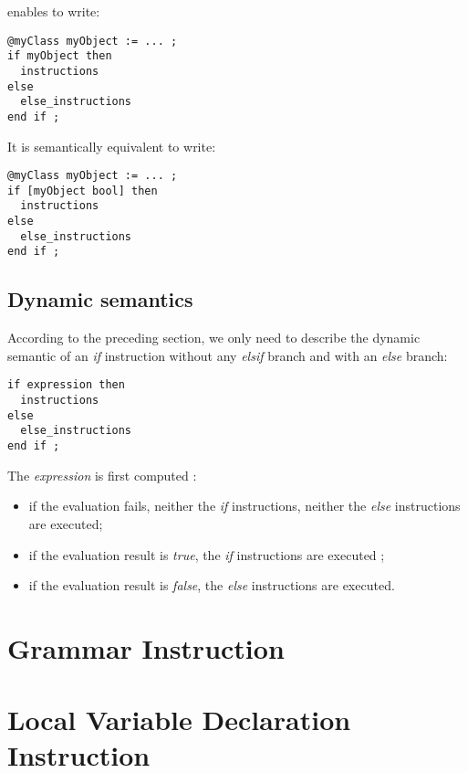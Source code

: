 enables to write:
{
\begin{lstlisting}[language=galgas]
@myClass myObject := ... ;
if myObject then
  instructions
else
  else_instructions
end if ;
\end{lstlisting}
}

It is semantically equivalent to write:
{
\begin{lstlisting}[language=galgas]
@myClass myObject := ... ;
if [myObject bool] then
  instructions
else
  else_instructions
end if ;
\end{lstlisting}
}


\subsection{Dynamic semantics}

According to the preceding section, we only need to describe the dynamic semantic of an \emph{if} instruction without any \emph{elsif} branch and with an \emph{else} branch:
{
\begin{lstlisting}[language=galgas]
if expression then
  instructions
else
  else_instructions
end if ;  
\end{lstlisting}
}



The \emph{expression} is first computed :
\begin{itemize}
\item if the evaluation fails, neither the \emph{if} instructions, neither the \emph{else} instructions are executed;
\item if the evaluation result is \emph{true}, the \emph{if} instructions are executed ;
\item if the evaluation result is \emph{false}, the \emph{else} instructions are executed.
\end{itemize}


\section{Grammar Instruction}

\section{Local Variable Declaration Instruction}


